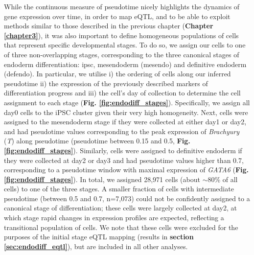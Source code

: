 While the continuous measure of pseudotime nicely highlights the dynamics of gene expression over time, in order to map eQTL, and to be able to exploit methods similar to those described in the previous chapter (\textbf{Chapter  \ref{chapter3}}), it was also important to define homogeneous populations of cells that represent specific developmental stages.
To do so, we assign our cells to one of three non-overlapping stages, corresponding to the three canonical stages of endoderm differentiation: \gls{ipsc}, mesendoderm (mesendo) and definitive endoderm (defendo).
In particular, we utilise i) the ordering of cells along our inferred pseudotime ii) the expression of the previously described markers of differentiation progress and iii) the cell's day of collection to determine the cell assignment to each stage (\textbf{Fig. \ref{fig:endodiff_stages}}).
Specifically, we assign all day0 cells to the iPSC cluster given their very high homogeneity.
Next, cells were assigned to the mesendoderm stage if they were collected at either day1 or day2, and had pseudotime values corresponding to the peak expression of \textit{Brachyury} (\textit{T}) along pseudotime (pseudotime between 0.15 and 0.5, \textbf{Fig. \ref{fig:endodiff_stages}}).  
Similarly, cells were assigned to definitive endoderm if they were collected at day2 or day3 and had pseudotime values higher than 0.7, corresponding to a pseudotime window with maximal expression of \textit{GATA6} (\textbf{Fig. \ref{fig:endodiff_stages}}).
In total, we assigned 28,971 cells (about $\sim$80\% of all cells) to one of the three stages. 
A smaller fraction of cells with intermediate pseudotime (between 0.5 and 0.7, n=7,073) could not be confidently assigned to a canonical stage of differentiation; these cells were largely collected at day2, at which stage rapid changes in expression profiles are expected, reflecting a transitional population of cells.
We note that these cells were excluded for the purposes of the initial stage eQTL mapping (results in \textbf{section \ref{sec:endodiff_eqtl}}), but are included in all other analyses. 

\vspace{2mm}

